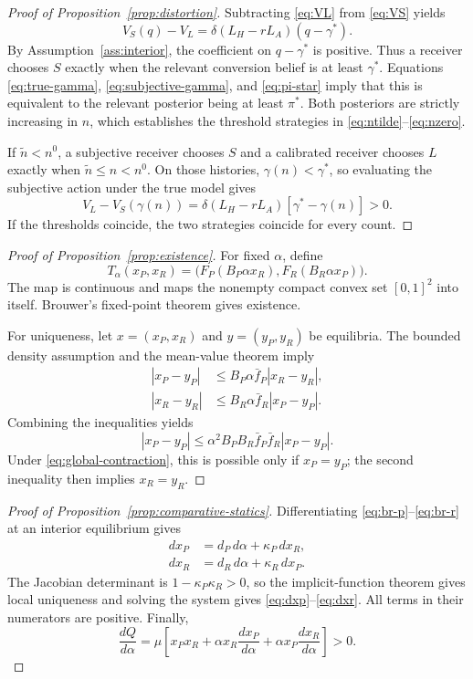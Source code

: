 \documentclass[11pt]{article}
\begin{document}
\begin{proof}[Proof of Proposition~\ref{prop:distortion}]
Subtracting \eqref{eq:VL} from \eqref{eq:VS} yields
\[
V_S(q)-V_L
=\delta(L_H-rL_A)(q-\gamma^*).
\]
By Assumption~\ref{ass:interior}, the coefficient on $q-\gamma^*$ is positive.
Thus a receiver chooses $S$ exactly when the relevant conversion belief is at
least $\gamma^*$. Equations \eqref{eq:true-gamma},
\eqref{eq:subjective-gamma}, and \eqref{eq:pi-star} imply that this is equivalent
to the relevant posterior being at least $\pi^*$. Both posteriors are strictly
increasing in $n$, which establishes the threshold strategies in
\eqref{eq:ntilde}--\eqref{eq:nzero}.

If $\widetilde n<n^0$, a subjective receiver chooses $S$ and a calibrated
receiver chooses $L$ exactly when $\widetilde n\leq n<n^0$. On those histories,
$\gamma(n)<\gamma^*$, so evaluating the subjective action under the true model
gives
\[
V_L-V_S(\gamma(n))
=\delta(L_H-rL_A)[\gamma^*-\gamma(n)]>0.
\]
If the thresholds coincide, the two strategies coincide for every count.
\end{proof}

\begin{proof}[Proof of Proposition~\ref{prop:existence}]
For fixed $\alpha$, define
\[
T_\alpha(x_P,x_R)
=\bigl(F_P(B_P\alpha x_R),F_R(B_R\alpha x_P)\bigr).
\]
The map is continuous and maps the nonempty compact convex set $[0,1]^2$ into
itself. Brouwer's fixed-point theorem gives existence.

For uniqueness, let $x=(x_P,x_R)$ and $y=(y_P,y_R)$ be equilibria. The bounded
density assumption and the mean-value theorem imply
\begin{align*}
|x_P-y_P|&\leq B_P\alpha\bar f_P|x_R-y_R|,\\
|x_R-y_R|&\leq B_R\alpha\bar f_R|x_P-y_P|.
\end{align*}
Combining the inequalities yields
\[
|x_P-y_P|
\leq\alpha^2B_PB_R\bar f_P\bar f_R|x_P-y_P|.
\]
Under \eqref{eq:global-contraction}, this is possible only if $x_P=y_P$;
the second inequality then implies $x_R=y_R$.
\end{proof}

\begin{proof}[Proof of Proposition~\ref{prop:comparative-statics}]
Differentiating \eqref{eq:br-p}--\eqref{eq:br-r} at an interior equilibrium
gives
\begin{align*}
dx_P&=d_P\,d\alpha+\kappa_P\,dx_R,\\
dx_R&=d_R\,d\alpha+\kappa_R\,dx_P.
\end{align*}
The Jacobian determinant is $1-\kappa_P\kappa_R>0$, so the implicit-function
theorem gives local uniqueness and solving the system gives
\eqref{eq:dxp}--\eqref{eq:dxr}. All terms in their numerators are positive.
Finally,
\[
\frac{dQ}{d\alpha}
=\mu\left[x_Px_R+\alpha x_R\frac{dx_P}{d\alpha}
+\alpha x_P\frac{dx_R}{d\alpha}\right]>0.
\]
\end{proof}
\end{document}

